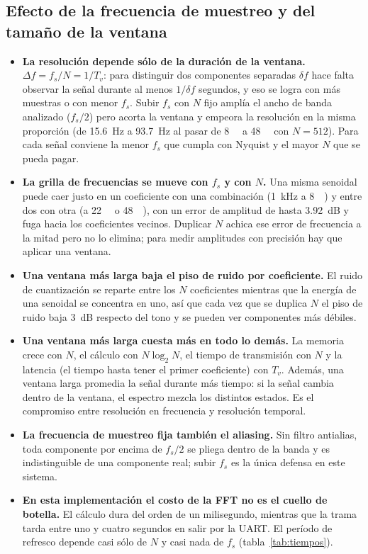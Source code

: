 \documentclass[11pt,a4paper]{article}
\begin{document}
\subsection{Efecto de la frecuencia de muestreo y del tamaño de la ventana}

\begin{itemize}
  \item \textbf{La resolución depende sólo de la duración de la ventana.}
        $\Delta f = f_s/N = 1/T_v$: para distinguir dos componentes
        separadas $\delta f$ hace falta observar la señal durante al menos
        $1/\delta f$ segundos, y eso se logra con más muestras o con menor
        $f_s$. Subir $f_s$ con $N$ fijo amplía el ancho de banda analizado
        ($f_s/2$) pero acorta la ventana y empeora la resolución en la misma
        proporción (de \qty{15.6}{\hertz} a \qty{93.7}{\hertz} al pasar de
        \qty{8}{\kilo\sps} a \qty{48}{\kilo\sps} con $N = 512$). Para cada
        señal conviene la menor $f_s$ que cumpla con Nyquist y el mayor $N$
        que se pueda pagar.
  \item \textbf{La grilla de frecuencias se mueve con $f_s$ y con $N$.} Una
        misma senoidal puede caer justo en un coeficiente con una
        combinación (\qty{1}{\kilo\hertz} a \qty{8}{\kilo\sps}) y entre dos
        con otra (a \qty{22}{\kilo\sps} o \qty{48}{\kilo\sps}), con un error
        de amplitud de hasta \qty{3.92}{\deci\bel} y fuga hacia los
        coeficientes vecinos. Duplicar $N$ achica ese error de frecuencia a
        la mitad pero no lo elimina; para medir amplitudes con precisión hay
        que aplicar una ventana.
  \item \textbf{Una ventana más larga baja el piso de ruido por
        coeficiente.} El ruido de cuantización se reparte entre los $N$
        coeficientes mientras que la energía de una senoidal se concentra en
        uno, así que cada vez que se duplica $N$ el piso de ruido baja
        \qty{3}{\deci\bel} respecto del tono y se pueden ver componentes más
        débiles.
  \item \textbf{Una ventana más larga cuesta más en todo lo demás.} La
        memoria crece con $N$, el cálculo con $N\log_2 N$, el tiempo de
        transmisión con $N$ y la latencia (el tiempo hasta tener el primer
        coeficiente) con $T_v$. Además, una ventana larga promedia la señal
        durante más tiempo: si la señal cambia dentro de la ventana, el
        espectro mezcla los distintos estados. Es el compromiso entre
        resolución en frecuencia y resolución temporal.
  \item \textbf{La frecuencia de muestreo fija también el aliasing.} Sin
        filtro antialias, toda componente por encima de $f_s/2$ se pliega
        dentro de la banda y es indistinguible de una componente real;
        subir $f_s$ es la única defensa en este sistema.
  \item \textbf{En esta implementación el costo de la FFT no es el cuello de
        botella.} El cálculo dura del orden de un milisegundo, mientras que
        la trama tarda entre uno y cuatro segundos en salir por la UART. El
        período de refresco depende casi sólo de $N$ y casi nada de $f_s$
        (tabla~\ref{tab:tiempos}).
\end{itemize}
\end{document}
